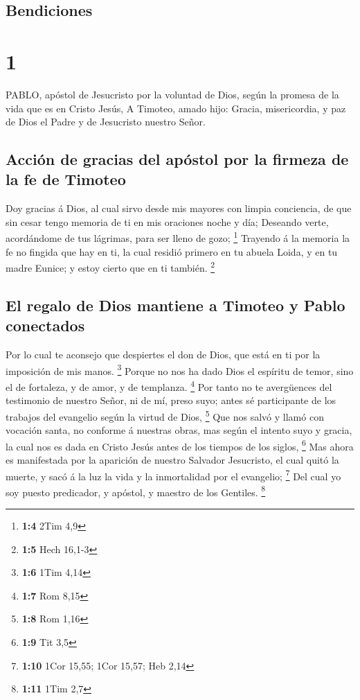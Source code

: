\hypertarget{bendiciones}{%
\subsection{Bendiciones}\label{bendiciones}}

\hypertarget{section}{%
\section{1}\label{section}}

 PABLO, apóstol de Jesucristo por la voluntad de Dios, según
la promesa de la vida que es en Cristo Jesús,  A Timoteo,
amado hijo: Gracia, misericordia, y paz de Dios el Padre y de Jesucristo
nuestro Señor.

\hypertarget{acciuxf3n-de-gracias-del-apuxf3stol-por-la-firmeza-de-la-fe-de-timoteo}{%
\subsection{Acción de gracias del apóstol por la firmeza de la fe de
Timoteo}\label{acciuxf3n-de-gracias-del-apuxf3stol-por-la-firmeza-de-la-fe-de-timoteo}}

 Doy gracias á Dios, al cual sirvo desde mis mayores con
limpia conciencia, de que sin cesar tengo memoria de ti en mis oraciones
noche y día;  Deseando verte, acordándome de tus lágrimas,
para ser lleno de gozo; \footnote{\textbf{1:4} 2Tim 4,9} 
Trayendo á la memoria la fe no fingida que hay en ti, la cual residió
primero en tu abuela Loida, y en tu madre Eunice; y estoy cierto que en
ti también. \footnote{\textbf{1:5} Hech 16,1-3}

\hypertarget{el-regalo-de-dios-mantiene-a-timoteo-y-pablo-conectados}{%
\subsection{El regalo de Dios mantiene a Timoteo y Pablo
conectados}\label{el-regalo-de-dios-mantiene-a-timoteo-y-pablo-conectados}}

 Por lo cual te aconsejo que despiertes el don de Dios, que
está en ti por la imposición de mis manos. \footnote{\textbf{1:6} 1Tim
  4,14}  Porque no nos ha dado Dios el espíritu de temor,
sino el de fortaleza, y de amor, y de templanza. \footnote{\textbf{1:7}
  Rom 8,15}  Por tanto no te avergüences del testimonio de
nuestro Señor, ni de mí, preso suyo; antes sé participante de los
trabajos del evangelio según la virtud de Dios, \footnote{\textbf{1:8}
  Rom 1,16}  Que nos salvó y llamó con vocación santa, no
conforme á nuestras obras, mas según el intento suyo y gracia, la cual
nos es dada en Cristo Jesús antes de los tiempos de los siglos,
\footnote{\textbf{1:9} Tit 3,5}  Mas ahora es manifestada
por la aparición de nuestro Salvador Jesucristo, el cual quitó la
muerte, y sacó á la luz la vida y la inmortalidad por el evangelio;
\footnote{\textbf{1:10} 1Cor 15,55; 1Cor 15,57; Heb 2,14} 
Del cual yo soy puesto predicador, y apóstol, y maestro de los Gentiles.
\footnote{\textbf{1:11} 1Tim 2,7}

